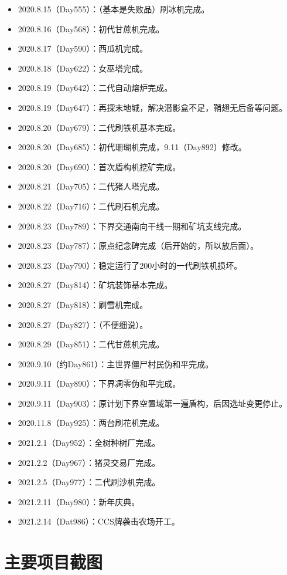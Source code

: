 \documentclass[openany]{book}
\theoremstyle{remark}\newtheorem*{remark}{Remark}
\begin{document}
\begin{itemize}
		\item 2020.8.15（Day555）：（基本是失败品）刷冰机完成。
		\item 2020.8.16（Day568）：初代甘蔗机完成。
		\item 2020.8.17（Day590）：西瓜机完成。
		\item 2020.8.18（Day622）：女巫塔完成。
		\item 2020.8.19（Day642）：二代自动熔炉完成。
		\item 2020.8.19（Day647）：再探末地城，解决潜影盒不足，鞘翅无后备等问题。
		\item 2020.8.20（Day679）：二代刷铁机基本完成。
		\item 2020.8.20（Day685）：初代珊瑚机完成，9.11（Day892）修改。
		\item 2020.8.20（Day690）：首次盾构机挖矿完成。
		\item 2020.8.21（Day705）：二代猪人塔完成。
		\item 2020.8.22（Day716）：二代刷石机完成。
		\item 2020.8.23（Day789）：下界交通南向干线一期和矿坑支线完成。
		\item 2020.8.23（Day787）：原点纪念碑完成（后开始的，所以放后面）。
		\item 2020.8.23（Day790）：稳定运行了200小时的一代刷铁机损坏。
		\item 2020.8.27（Day814）：矿坑装饰基本完成。
		\item 2020.8.27（Day818）：刷雪机完成。
		\item 2020.8.27（Day827）：（不便细说）。
		\item 2020.8.29（Day851）：二代甘蔗机完成。
		\item 2020.9.10（约Day861）：主世界僵尸村民伪和平完成。
		\item 2020.9.11（Day890）：下界凋零伪和平完成。
		\item 2020.9.11（Day903）：原计划下界空置域第一遍盾构，后因选址变更停止。
		\item 2020.11.8（Day925）：两台刷花机完成。
		\item 2021.2.1（Day952）：全树种树厂完成。
		\item 2021.2.2（Day967）：猪灵交易厂完成。
		\item 2021.2.5（Day977）：二代刷沙机完成。
		\item 2021.2.11（Day980）：新年庆典。
		\item 2021.2.14（Dat986）：CCS牌袭击农场开工。
	\end{itemize}
	
	\section{主要项目截图}
	
\end{document}
